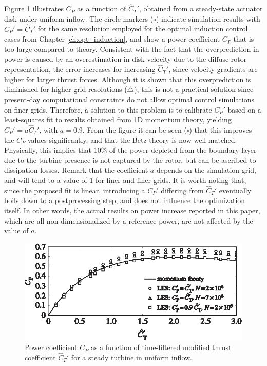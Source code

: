 Figure \ref{fig:fit} illustrates $C_P$ as a function of $\widehat{C}_T'$, obtained from a steady-state actuator disk under uniform inflow. The circle markers ($\circ$) indicate simulation results with $C_P' = \widehat{C}_T'$ for the same resolution employed for the optimal induction control cases from Chapter \ref{ch:opt_induction}, and show a power coefficient $C_P$ that is too large compared to theory. Consistent with the fact that the overprediction in power is caused by an overestimation in disk velocity due to the diffuse rotor representation, the error increases for increasing $\widehat{C}_T'$, since velocity gradients are higher for larger thrust forces. Although it is shown that this overprediction is diminished for higher grid resolutions ($\triangle$), this is not a practical solution since present-day computational constraints do not allow optimal control simulations on finer grids. Therefore, a solution to this problem is to calibrate $C_P'$ based on a least-squares fit to results obtained from 1D momentum theory, yielding $C_P' = a \widehat{C}_T'$, with $a = 0.9$. From the figure it can be seen ($\square$) that this improves the $C_P$ values significantly, and that the Betz theory is now well matched. Physically, this implies that 10\% of the power depleted from the boundary layer due to the turbine presence is not captured by the rotor, but can be ascribed to dissipation losses. Remark that the coefficient $a$ depends on the simulation grid, and will tend to a value of 1 for finer and finer grids. It is worth noting that, since the proposed fit is linear, introducing a $C_P'$ differing from $\widehat{C}_T'$ eventually boils down to a postprocessing step, and does not influence the optimization itself. In other words, the actual results on power increase reported in this paper, which are all non-dimensionalized by a reference power, are not affected by the value of $a$.


\begin{figure}[h!]
	\centering
	\includegraphics[width=0.8\linewidth]{chapters/appendix_adm/fig_tuning.eps}
	\caption{Power coefficient $C_P$ as a function of time-filtered modified thrust coefficient $\widehat{C}_T'$ for a steady turbine in uniform inflow.}
	\label{fig:fit}
\end{figure}

\cleardoublepage